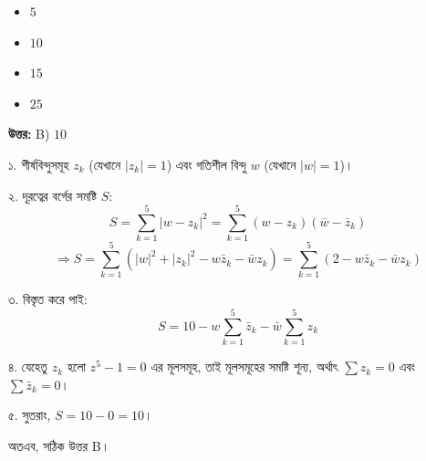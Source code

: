 \documentclass[12pt, a4paper]{article}
\begin{document}
\begin{itemize}[label={}, leftmargin=1cm, itemsep=0.5em]
    \item[\textbf{A)}] $5$
    \item[\textbf{B)}] $10$
    \item[\textbf{C)}] $15$
    \item[\textbf{D)}] $25$
\end{itemize}

\vspace{0.5em}
\begin{tcolorbox}[answerbox]
    \textbf{\color{success} উত্তর:} B) $10$
\end{tcolorbox}
\vspace{1em}

\begin{tcolorbox}[solutionbox={সমাধান (Solution)}]
    \noindent
    ১. শীর্ষবিন্দুসমূহ $z_k$ (যেখানে $|z_k| = 1$) এবং গতিশীল বিন্দু $w$ (যেখানে $|w| = 1$)।
    
    \vspace{0.5em}
    ২. দূরত্বের বর্গের সমষ্টি $S$:
    \[ S = \sum_{k=1}^5 |w - z_k|^2 = \sum_{k=1}^5 (w - z_k)(\bar{w} - \bar{z}_k) \]
    \[ \Rightarrow S = \sum_{k=1}^5 \left( |w|^2 + |z_k|^2 - w\bar{z}_k - \bar{w}z_k \right) = \sum_{k=1}^5 \left( 2 - w\bar{z}_k - \bar{w}z_k \right) \]
    
    \vspace{0.5em}
    ৩. বিস্তৃত করে পাই:
    \[ S = 10 - w\sum_{k=1}^5 \bar{z}_k - \bar{w}\sum_{k=1}^5 z_k \]
    
    \vspace{0.5em}
    ৪. যেহেতু $z_k$ হলো $z^5 - 1 = 0$ এর মূলসমূহ, তাই মূলসমূহের সমষ্টি শূন্য, অর্থাৎ $\sum z_k = 0$ এবং $\sum \bar{z}_k = 0$।
    
    \vspace{0.5em}
    ৫. সুতরাং, $S = 10 - 0 = 10$।
    
    \vspace{0.5em}
    অতএব, সঠিক উত্তর B।
\end{tcolorbox}

\vspace{2em}
\end{document}
